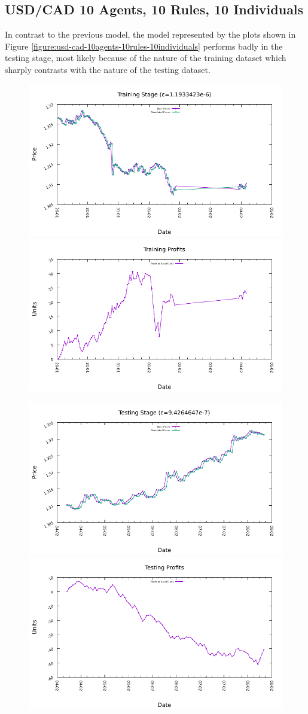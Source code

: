 \newpage

\subsection{USD/CAD 10 Agents, 10 Rules, 10 Individuals}
\label{results:forecast-usd-cad-10agents-10rules-10individuals}

In contrast to the previous model, the model represented by the plots shown in Figure \ref{figure:usd-cad-10agents-10rules-10individuals} performs badly in the testing stage, most likely because of the nature of the training dataset which sharply contrasts with the nature of the testing dataset.

\begin{figure}[htp]
  \centering

  \includegraphics[width=.45\textwidth]{img/plots/usd_cad_h1-10agents-10rules-10ind-100gen_training_fit.pdf}\quad
  \includegraphics[width=.45\textwidth]{img/plots/usd_cad_h1-10agents-10rules-10ind-100gen_training_profits.pdf}

  \medskip

  \includegraphics[width=.45\textwidth]{img/plots/usd_cad_h1-10agents-10rules-10ind-100gen_testing_fit.pdf}\quad
  \includegraphics[width=.45\textwidth]{img/plots/usd_cad_h1-10agents-10rules-10ind-100gen_testing_profits.pdf}


\end{figure}
